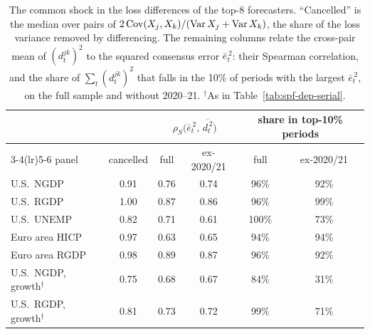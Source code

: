 \begin{table}[htb]
  \centering
  \caption[The common shock in loss differences]{The common shock in the loss differences of the top-8
  forecasters. ``Cancelled'' is the median over pairs of $2\operatorname{Cov}(X_j,X_k)/(\operatorname{Var} X_j+\operatorname{Var} X_k)$, the share of the
  loss variance removed by differencing. The remaining columns relate the cross-pair mean of $(d^{jk}_t)^2$ to the
  squared consensus error $\bar e_t^{\,2}$: their Spearman correlation, and the share of $\sum_t (d^{jk}_t)^2$ that
  falls in the 10\% of periods with the largest $\bar e_t^{\,2}$, on the full sample and without 2020--21.
  $^\dagger$As in Table~\ref{tab:spf-dep-serial}.}
  \label{tab:spf-dep-diff}
  \small
  \begin{tabular}{lccccc}
    \toprule
    & & \multicolumn{2}{c}{$\rho_S\big(\bar e_t^{\,2},\,\overline{d_t^{\,2}}\big)$}
      & \multicolumn{2}{c}{share in top-10\% periods}\\
    \cmidrule(lr){3-4}\cmidrule(lr){5-6}
    panel & cancelled & full & ex-2020/21 & full & ex-2020/21\\
    \midrule
    U.S.\ NGDP & 0.91 & 0.76 & 0.74 & 96\% & 92\%\\
    U.S.\ RGDP & 1.00 & 0.87 & 0.86 & 96\% & 99\%\\
    U.S.\ UNEMP & 0.82 & 0.71 & 0.61 & 100\% & 73\%\\
    Euro area HICP & 0.97 & 0.63 & 0.65 & 94\% & 94\%\\
    Euro area RGDP & 0.98 & 0.89 & 0.87 & 96\% & 92\%\\
    \midrule
    U.S.\ NGDP, growth$^\dagger$ & 0.75 & 0.68 & 0.67 & 84\% & 31\%\\
    U.S.\ RGDP, growth$^\dagger$ & 0.81 & 0.73 & 0.72 & 99\% & 71\%\\
    \bottomrule
  \end{tabular}
\end{table}
